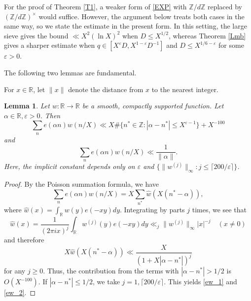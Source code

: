 \documentclass[10pt,a4paper]{amsart}
\newtheorem{lem}[dfn]{Lemma}
\newcommand{\1}{
    \bm{1}
}
\newcommand{\pZ}[1]{
(\mathbb{Z}/{ #1 \mathbb{Z}})^{\times}
}
\newcommand{\aZ}[1]{
\mathbb{Z}/{ #1 \mathbb{Z}}
}
\begin{document}
For the proof of Theorem \ref{T1}, a weaker form of \eqref{EXP} with $\aZ{d}$ replaced by $\pZ{d}$ would suffice. However, the argument below treats both cases in the same way, so we state the estimate in the present form.
In this setting, the large sieve gives the bound $\ll X^2(\ln X)^2$ when $D \leq X^{1/2}$, whereas Theorem \ref{Lmb} gives a sharper estimate when $q \in [X^{\varepsilon}D,X^{1-\varepsilon}D^{-1}]$ and $D \leq X^{1/6 - \varepsilon}$ for some $\varepsilon>0$.  



The following two lemmas are fundamental. 

For $x \in \mathbb{R}$, let $\|x\|$ denote the distance from $x$ to the nearest integer. 
\begin{lem}\label{sumw}
Let $w:\mathbb{R} \to \mathbb{R}$ be a smooth, compactly supported function. 
Let $\alpha \in \mathbb{R}, \varepsilon>0$. Then
\begin{equation} \sum_{n} e(\alpha n) w(n/X) \ll X\#\{ n^* \in \mathbb{Z} : |\alpha - n^*| \leq X^{\varepsilon-1} \} + X^{-100} \label{ew_1} \end{equation}
and
\begin{equation} \sum_{n} e(\alpha n) w(n/X) \ll \frac{1}{\|\alpha\|}. \label{ew_2} \end{equation}
Here, the implicit constant depends only on $\varepsilon$ and $\{\|w^{(j)}\|_{\infty} : j \leq \lceil 200/\varepsilon \rceil \}$. 
\end{lem}

\begin{proof}
By the Poisson summation formula, we have
\[ \sum_{n} e(\alpha n) w(n/X) = X \sum_{n^*} \hat{w}(X(n^*-\alpha)), \]
where $\hat{w}(x) = \int_{\mathbb{R}} w(y) e(-xy) dy$. Integrating by parts $j$ times, we see that
\[ \hat{w}(x) = \frac{1}{(2\pi i x)^j} \int_{\mathbb{R}} w^{(j)}(y) e(-xy) dy \ll_j \|w^{(j)}\|_{\infty} |x|^{-j} \quad (x \neq 0) \]
and therefore
\[ X \hat{w}(X(n^*-\alpha)) \ll \frac{X}{(1+X|\alpha-n^*|)^j} \]
for any $j \geq 0$. Thus, the contribution from the terms with $|\alpha-n^*|>1/2$ is $O(X^{-100})$. 
If $|\alpha-n^*|\leq1/2$, we take $j=1, \lceil 200/\varepsilon \rceil$. This yields \eqref{ew_1} and \eqref{ew_2}. 
\end{proof}
\end{document}
